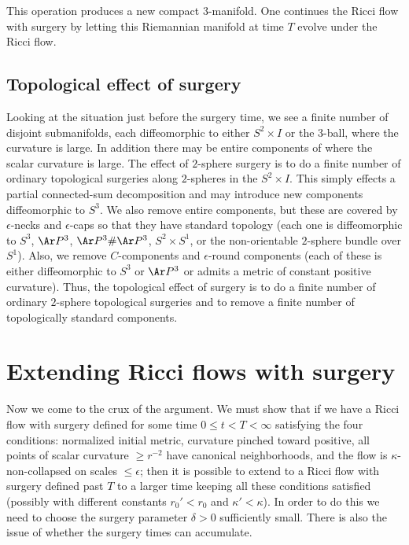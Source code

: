 This operation produces a new compact $3$-manifold.  One continues
the Ricci flow with surgery by letting this Riemannian manifold at
time $T$ evolve under the Ricci flow. 




  

\subsection{Topological effect of surgery}

Looking at the
situation just before the surgery time, we see a finite number of
disjoint submanifolds, each diffeomorphic to either $S^2\times I$ or
the $3$-ball, where the curvature is large. In addition there may be
entire components of where the scalar curvature is large. The effect
of $2$-sphere surgery is to do a finite number of ordinary
topological surgeries along $2$-spheres in the $S^2\times I$. This
simply effects a partial connected-sum decomposition and may
introduce new components diffeomorphic to $S^3$. We also remove
entire components, but these are covered by $\epsilon$-necks and
$\epsilon$-caps  so that they have standard topology (each one is
diffeomorphic to $S^3$, $\Ar P^3$, $\Ar P^3\# \Ar P^3$, $S^2\times
S^1$, or the non-orientable $2$-sphere bundle over $S^1$). Also, we
remove $C$-components and $\epsilon$-round components (each of these
is either diffeomorphic to $S^3$ or $\Ar P^3$ or admits a metric of
constant positive curvature). Thus, the topological effect of
surgery is to do a finite number of ordinary $2$-sphere topological
surgeries and to remove a finite number of topologically standard
components.



\section{Extending Ricci flows with surgery}

Now we come to the crux of the argument. We must show that if we
have a Ricci flow with surgery defined for some time $0\le
t<T<\infty$ satisfying the four conditions: normalized initial
metric, curvature pinched toward positive, all points of scalar
curvature $\ge r^{-2}$ have canonical neighborhoods, and the flow is
$\kappa$-non-collapsed on scales $\le \epsilon$; then it is possible
to extend to a Ricci flow with surgery defined past $T$ to a larger
time keeping all these conditions satisfied (possibly with different
constants $r_0'<r_0$ and $\kappa'<\kappa$). In order to do this we
need to choose the surgery parameter $\delta>0$ sufficiently small.
There is also the issue of whether the surgery times can accumulate.

